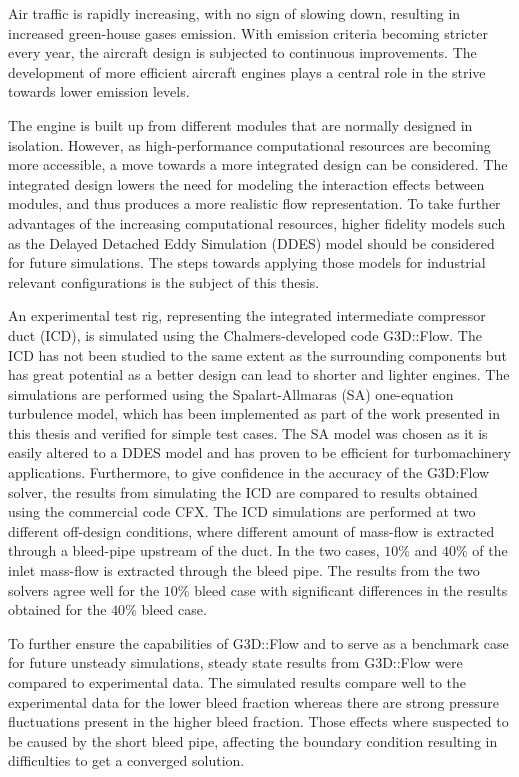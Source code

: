 Air traffic is rapidly increasing, with no sign of slowing down, resulting in increased green-house gases emission. With emission criteria becoming stricter every year, the aircraft design is subjected to continuous improvements. The development of more efficient aircraft engines plays a central role in the strive towards lower emission levels.

The engine is built up from different modules that are normally designed in isolation. However, as high-performance computational resources are becoming more accessible, a move towards a more integrated design can be considered. The integrated design lowers the need for modeling the interaction effects between modules, and thus produces a more realistic flow representation. To take further advantages of the increasing computational resources, higher fidelity models such as the Delayed Detached Eddy Simulation (DDES) model should be considered for future simulations. The steps towards applying those models for industrial relevant configurations is the subject of this thesis.

An experimental test rig, representing the integrated intermediate compressor duct (ICD), is simulated using the Chalmers-developed code G3D::Flow. The ICD has not been studied to the same extent as the surrounding components but has great potential as a better design can lead to shorter and lighter engines. The simulations are performed using the Spalart-Allmaras (SA) one-equation turbulence model, which has been implemented as part of the work presented in this thesis and verified for simple test cases. The SA model was chosen as it is easily altered to a DDES model and has proven to be efficient for turbomachinery applications. Furthermore, to give confidence in the accuracy of the G3D:Flow solver, the results from simulating the ICD are compared to results obtained using the commercial code CFX. The ICD simulations are performed at two different off-design conditions, where different amount of mass-flow is extracted through a bleed-pipe upstream of the duct. In the two cases, $10\%$ and $40\%$ of the inlet mass-flow is extracted through the bleed pipe. The results from the two solvers agree well for the $10\%$ bleed case with significant differences in the results obtained for the $40\%$ bleed case.

To further ensure the capabilities of G3D::Flow and to serve as a benchmark case for future unsteady simulations, steady state results from G3D::Flow were compared to experimental data. The simulated results compare well to the experimental data for the lower bleed fraction whereas there are strong pressure fluctuations present in the higher bleed fraction. Those effects where suspected to be caused by the short bleed pipe, affecting the boundary condition resulting in difficulties to get a converged solution.


